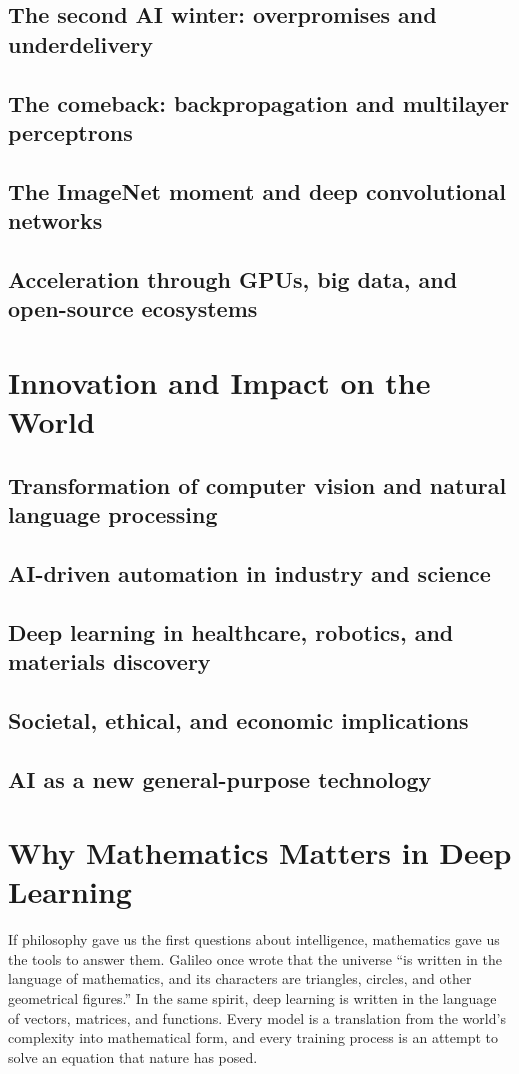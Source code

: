 \subsection{The second AI winter: overpromises and underdelivery}
\subsection{The comeback: backpropagation and multilayer perceptrons}
\subsection{The ImageNet moment and deep convolutional networks}
\subsection{Acceleration through GPUs, big data, and open-source ecosystems}


\section{Innovation and Impact on the World}
\subsection{Transformation of computer vision and natural language processing}
\subsection{AI-driven automation in industry and science}
\subsection{Deep learning in healthcare, robotics, and materials discovery}
\subsection{Societal, ethical, and economic implications}
\subsection{AI as a new general-purpose technology}


\section{Why Mathematics Matters in Deep Learning}

If philosophy gave us the first questions about intelligence, mathematics gave us the tools to answer them. Galileo once wrote that the universe ``is written in the language of mathematics, and its characters are triangles, circles, and other geometrical figures.'' In the same spirit, deep learning is written in the language of vectors, matrices, and functions. Every model is a translation from the world’s complexity into mathematical form, and every training process is an attempt to solve an equation that nature has posed.

